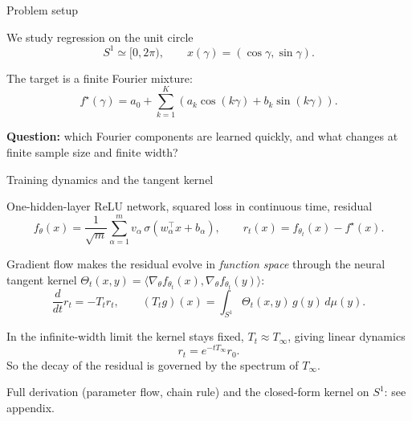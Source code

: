 \documentclass[10pt,aspectratio=169]{beamer}
\begin{document}
\begin{frame}{Problem setup}

	We study regression on the unit circle
	\[
		S^1 \simeq [0,2\pi),
		\qquad
		x(\gamma)=(\cos\gamma,\sin\gamma).
	\]

	The target is a finite Fourier mixture:
	\[
		f^\star(\gamma)
		=
		a_0
		+
		\sum_{k=1}^{K}
		\left(
		a_k\cos(k\gamma)
		+
		b_k\sin(k\gamma)
		\right).
	\]

	\medskip

	\textbf{Question:}
	which Fourier components are learned quickly, and what changes at finite sample size and finite width?


\end{frame}

\begin{frame}{Training dynamics and the tangent kernel}

	One-hidden-layer ReLU network, squared loss in continuous time, residual
	\[
		f_\theta(x)=\frac{1}{\sqrt m}\sum_{\alpha=1}^{m}v_\alpha\,\sigma(w_\alpha^\top x+b_\alpha),
		\qquad
		r_t(x)=f_{\theta_t}(x)-f^\star(x).
	\]

	\pause
	Gradient flow makes the residual evolve in \emph{function space} through the neural tangent kernel
	\(\Theta_t(x,y)=\langle\nabla_\theta f_{\theta_t}(x),\nabla_\theta f_{\theta_t}(y)\rangle\):
	\[
		\frac{d}{dt}r_t=-T_t r_t,
		\qquad
		(T_t g)(x)=\int_{S^1}\Theta_t(x,y)\,g(y)\,d\mu(y).
	\]

	\pause
	In the infinite-width limit the kernel stays fixed, \(T_t\approx T_\infty\), giving linear dynamics
	\[
		r_t=e^{-tT_\infty}r_0 .
	\]
	So the decay of the residual is governed by the spectrum of \(T_\infty\).

	\medskip
	{\footnotesize Full derivation (parameter flow, chain rule) and the closed-form kernel on \(S^1\): see appendix.}


\end{frame}
\end{document}
